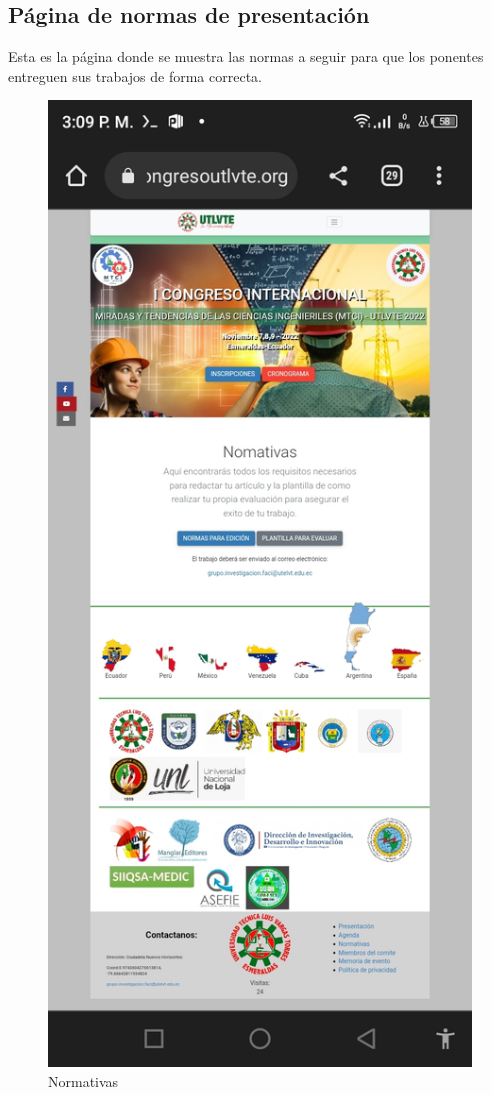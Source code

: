 \documentclass[a4paper,14px]{article}
\begin{document}
\newpage
\subsection{Página de normas de presentación }
\label{sec:pagina-principal}

Esta es la página  donde se muestra las normas a seguir para que los ponentes entreguen sus trabajos de forma correcta.


\begin{minipage}[H]{0.45\linewidth}
  \begin{figure}[H]
    \centering
    \includegraphics[scale=0.3]{normativas.jpg}
    \caption{Normativas}
    \label{fig:arquitectura}
  \end{figure}

\end{minipage}
\end{document}
